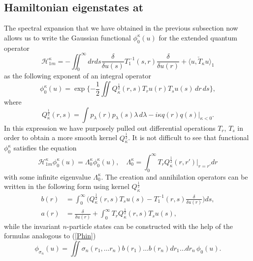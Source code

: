 \documentclass[12pt]{article}
\newcommand{\HH}{\mathscr{H}}
\begin{document}
\subsection{Hamiltonian eigenstates at
}
	The spectral expansion that we have obtained in the previous subsection
	now allows us to write the Gaussian functional
$ \phi_{0}^{\kappa}(u) $
	for the extended quantum operator
\begin{equation*}
    \HH_{1m}^{\kappa} = -\iint_{0}^{\infty} dr ds
    \frac{\delta}{\delta u(s)} T_{1}^{-1}(s,r)
	\frac{\delta}{\delta u(r)}
	+ \langle u, \check{T}_{\kappa}u\rangle_{1}
\end{equation*}
	as the following exponent of an integral operator
\begin{equation*}
    \phi_{0}^{\kappa}(u)
	= \exp\{-\frac{1}{2} \iint Q_{\kappa}^{\frac{1}{2}}(r,s)
	T_{r}u(r) T_{s}u(s) \, dr\,ds\} ,
\end{equation*}
	where
\begin{equation*}
    Q_{\kappa}^{\frac{1}{2}}(r,s) = \int p_{\lambda}(r) p_{\lambda}(s)
	\lambda\,d\lambda - i\kappa q(r)q(s) \bigr|_{\kappa <0} .
\end{equation*}
	In this expression we have purposely pulled out differential operations
$ T_{r} $, 
$ T_{s} $
	in order to obtain a more smooth kernel
$ Q_{\kappa}^{\frac{1}{2}} $.
	It is not difficult to see that functional
$ \phi_{0}^{\kappa} $
	satisfies the equation
\begin{equation*}
    \HH_{1m}^{\kappa} \phi_{0}^{\kappa}(u)
	= \Lambda_{0}^{\kappa} \phi_{0}^{\kappa}(u) ,\quad
    \Lambda_{0}^{\kappa} = \int_{0}^{\infty} T_{r}
	Q_{\kappa}^{\frac{1}{2}}(r,r') |_{r=r'} dr
\end{equation*}
	with some infinite eigenvalue
$ \Lambda_{0}^{\kappa} $.
	The creation and annihilation operators can be
	written in the following form using kernel
$ Q_{\kappa}^{\frac{1}{2}} $
\begin{align*}
    b(r) &= \int_{0}^{\infty} \bigl( Q_{\kappa}^{\frac{1}{2}}(r,s)T_{s}u(s)
	- T_{1}^{-1}(r,s) \frac{\delta}{\delta u(r)} \bigr) ds , \\
    a(r) &= \frac{\delta}{\delta u(r)} + \int_{0}^{\infty} 
	T_{r} Q_{\kappa}^{\frac{1}{2}}(r,s) T_{s} u(s) ,
\end{align*}
	while the invariant
$ n $-particle states can be constructed with the help of the formulas analogous to
(\ref{Phin})
\begin{equation*}
    \phi_{\sigma_{n}}(u) = \iint
    \sigma_{n} (r_{1},\ldots r_{n})
	b(r_{1}) \ldots b(r_{n})
    dr_{1} \ldots dr_{n} \, \phi_{0}(u) .
\end{equation*}
\end{document}
